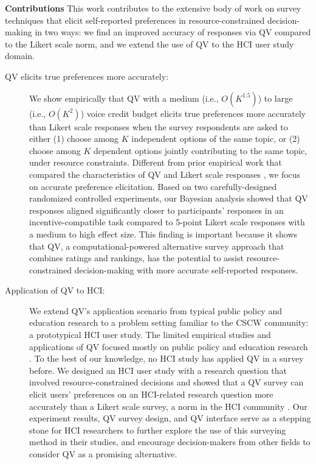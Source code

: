 \textbf{Contributions} This work contributes to the extensive body of work on survey techniques that elicit self-reported preferences in resource-constrained decision-making in two ways: we find an improved accuracy of responses via QV compared to the Likert scale norm, and we extend the use of QV to the HCI user study domain.

\begin{description}
\item[QV elicits true preferences more accurately:] We show empirically that QV with a medium (i.e., $O(K^{1.5})$) to large (i.e., $O(K^{2})$) voice credit budget elicits true preferences more accurately than Likert scale responses when the survey respondents are asked to either (1) choose among $K$ independent options of the same topic, or (2) choose among $K$ dependent options jointly contributing to the same topic, under resource constraints. Different from prior empirical work that compared the characteristics of QV and Likert scale responses \cite{quarfoot2017quadratic, naylor2017first}, we focus on accurate preference elicitation. Based on two carefully-designed randomized controlled experiments, our Bayesian analysis showed that QV responses aligned significantly closer to participants' responses in an incentive-compatible task compared to 5-point Likert scale responses with a medium to high effect size. This finding is important because it shows that QV, a computational-powered alternative survey approach that combines ratings and rankings, has the potential to assist resource-constrained decision-making with more accurate self-reported responses.
\item[Application of QV to HCI:] We extend QV's application scenario from typical public policy and education research to a problem setting familiar to the CSCW community: a prototypical HCI user study. The limited empirical studies and applications of QV focused mostly on public policy \cite{quarfoot2017quadratic, colorado_qv} and education research \cite{naylor2017first}. To the best of our knowledge, no HCI study has applied QV in a survey before. We designed an HCI user study with a research question that involved resource-constrained decisions and showed that a QV survey can elicit users' preferences on an HCI-related research question more accurately than a Likert scale survey, a norm in the HCI community \cite{ledo2018evaluation}. Our experiment results, QV survey design, and QV interface serve as a stepping stone for HCI researchers to further explore the use of this surveying method in their studies, and encourage decision-makers from other fields to consider QV as a promising alternative.
\end{description}


